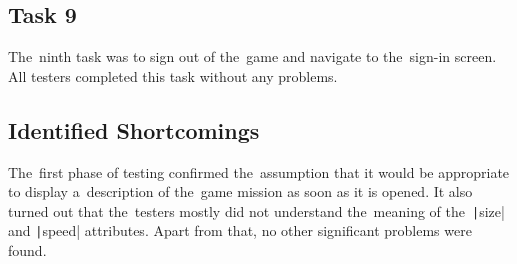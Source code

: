 \subsection*{Task 9}

The~ninth task was to sign out of the~game and navigate to the~sign-in screen.
All testers completed this task without any problems.

\subsection*{Identified Shortcomings}

The~first phase of testing confirmed the~assumption that it would be appropriate to display a~description of the~game mission as soon as it is opened.
It also turned out that the~testers mostly did not understand the~meaning of the~\texttt|size| and \texttt|speed| attributes.
Apart from that, no other significant problems were found.

